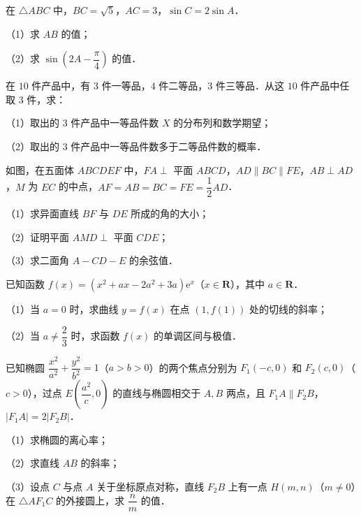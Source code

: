 \begin{question}
在 $\triangle ABC$ 中，$BC=\sqrt5$，$AC=3$，$\sin C=2\sin A$．

（1）求 $AB$ 的值；

（2）求 $\sin\left(2A-\dfrac{\pi}{4}\right)$ 的值．

\end{question}
\begin{question}
在 $10$ 件产品中，有 $3$ 件一等品，$4$ 件二等品，$3$ 件三等品．从这 $10$ 件产品中任取 $3$ 件，求：

（1）取出的 $3$ 件产品中一等品件数 $X$ 的分布列和数学期望；

（2）取出的 $3$ 件产品中一等品件数多于二等品件数的概率．

\Needspace{0.4\textheight}
\end{question}
\begin{question}
如图，在五面体 $ABCDEF$ 中，$FA\perp$ 平面 $ABCD$，$AD\parallel BC\parallel FE$，$AB\perp AD$，$M$ 为 $EC$ 的中点，$AF=AB=BC=FE=\dfrac12AD$．
\nopagebreak[4]
\begin{center}\end{center}
\nopagebreak[4]
（1）求异面直线 $BF$ 与 $DE$ 所成的角的大小；

（2）证明平面 $AMD\perp$ 平面 $CDE$；

（3）求二面角 $A-CD-E$ 的余弦值．

\end{question}
\begin{question}
已知函数 $f(x)=(x^2+ax-2a^2+3a)\mathrm e^x$（$x\in\mathbf R$），其中 $a\in\mathbf R$．

（1）当 $a=0$ 时，求曲线 $y=f(x)$ 在点 $(1,f(1))$ 处的切线的斜率；

（2）当 $a\neq\dfrac23$ 时，求函数 $f(x)$ 的单调区间与极值．

\end{question}
\begin{question}
已知椭圆 $\dfrac{x^2}{a^2}+\dfrac{y^2}{b^2}=1$（$a>b>0$）的两个焦点分别为 $F_1(-c,0)$ 和 $F_2(c,0)$（$c>0$），过点 $E\left(\dfrac{a^2}{c},0\right)$ 的直线与椭圆相交于 $A,B$ 两点，且 $F_1A\parallel F_2B$，$|F_1A|=2|F_2B|$．

（1）求椭圆的离心率；

（2）求直线 $AB$ 的斜率；

（3）设点 $C$ 与点 $A$ 关于坐标原点对称，直线 $F_2B$ 上有一点 $H(m,n)$（$m\neq0$）在 $\triangle AF_1C$ 的外接圆上，求 $\dfrac nm$ 的值．

\end{question}
